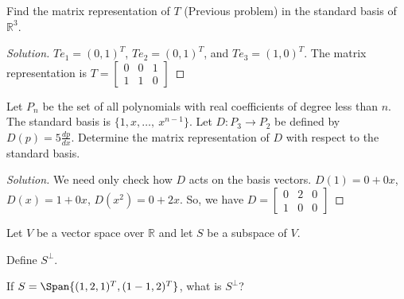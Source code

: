 \documentclass[crop=false,class=book,oneside]{standalone}
\begin{document}
        \begin{problem}
        Find the matrix representation of $T$ (Previous problem) in the standard basis of $\mathbb{R}^3$.
        \end{problem}
        \begin{proof}[Solution]
        $Te_1 = (0,1)^T$, $T e_2 = (0,1)^T$, and $Te_3 = (1,0)^T$. The matrix representation is $T=\begin{bmatrix} 0 & 0 & 1 \\ 1 & 1 & 0 \end{bmatrix}$
        \end{proof}
        \begin{problem}
        Let $P_n$ be the set of all polynomials with real coefficients of degree less than $n$. The standard basis is $\{1,x,\hdots, \ x^{n-1}\}$. Let $D:P_3 \rightarrow P_2$ be defined by $D(p) = 5\frac{dp}{dx}$. Determine the matrix representation of $D$ with respect to the standard basis.
        \end{problem}
        \begin{proof}[Solution]
        We need only check how $D$ acts on the basis vectors. $D(1) = 0+0x$, $D(x) = 1+0x$, $D(x^2) = 0+2x$. So, we have $D = \begin{bmatrix} 0 & 2 & 0 \\ 1 & 0 & 0 \end{bmatrix}$
        \end{proof}
        \begin{problem}
        Let $V$ be a vector space over $\mathbb{R}$ and let $S$ be a subspace of $V$.
        \begin{enumerate}
        \begin{multicols}{2}
            \item Define $S^{\perp}$.
            \item If $S=\Span\{ (1,2,1)^T, (1-1,2)^T\}$, what is $S^{\perp}$?
        \end{multicols}
        \end{enumerate}
        \end{problem}
\end{document}
